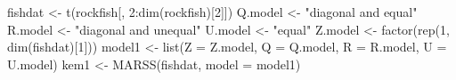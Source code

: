 \begin{Schunk}
\begin{Sinput}
 fishdat <- t(rockfish[, 2:dim(rockfish)[2]])
 Q.model <- "diagonal and equal"
 R.model <- "diagonal and unequal"
 U.model <- "equal"
 Z.model <- factor(rep(1, dim(fishdat)[1]))
 model1 <- list(Z = Z.model, Q = Q.model, R = R.model, U = U.model)
 kem1 <- MARSS(fishdat, model = model1)
\end{Sinput}
\end{Schunk}
